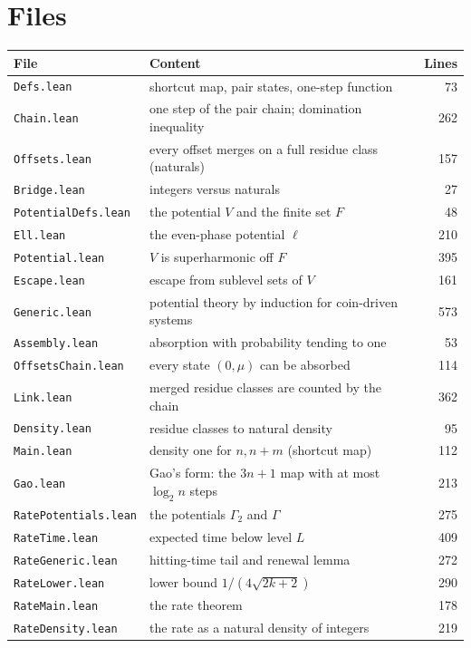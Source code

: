 \documentclass[10pt]{article}
\begin{document}
\section{Files}
\begin{center}\begin{tabular}{llr}\toprule
File & Content & Lines\\\midrule
\texttt{Defs.lean} & shortcut map, pair states, one-step function & 73\\
\texttt{Chain.lean} & one step of the pair chain; domination inequality & 262\\
\texttt{Offsets.lean} & every offset merges on a full residue class (naturals) & 157\\
\texttt{Bridge.lean} & integers versus naturals & 27\\
\texttt{PotentialDefs.lean} & the potential $V$ and the finite set $F$ & 48\\
\texttt{Ell.lean} & the even-phase potential $\ell$ & 210\\
\texttt{Potential.lean} & $V$ is superharmonic off $F$ & 395\\
\texttt{Escape.lean} & escape from sublevel sets of $V$ & 161\\
\texttt{Generic.lean} & potential theory by induction for coin-driven systems & 573\\
\texttt{Assembly.lean} & absorption with probability tending to one & 53\\
\texttt{OffsetsChain.lean} & every state $(0,\mu)$ can be absorbed & 114\\
\texttt{Link.lean} & merged residue classes are counted by the chain & 362\\
\texttt{Density.lean} & residue classes to natural density & 95\\
\texttt{Main.lean} & density one for $n,n+m$ (shortcut map) & 112\\
\texttt{Gao.lean} & Gao's form: the $3n+1$ map with at most $\log_2 n$ steps & 213\\
\texttt{RatePotentials.lean} & the potentials $\Gamma_2$ and $\Gamma$ & 275\\
\texttt{RateTime.lean} & expected time below level $L$ & 409\\
\texttt{RateGeneric.lean} & hitting-time tail and renewal lemma & 272\\
\texttt{RateLower.lean} & lower bound $1/(4\sqrt{2k+2})$ & 290\\
\texttt{RateMain.lean} & the rate theorem & 178\\
\texttt{RateDensity.lean} & the rate as a natural density of integers & 219\\

\end{tabular}
\end{center}
\end{document}
